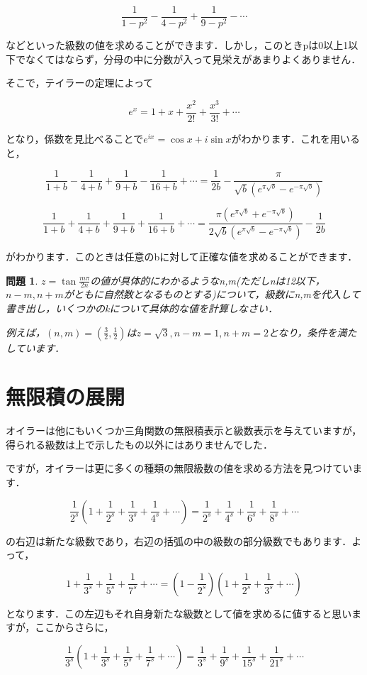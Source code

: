 \documentclass[./main]{subfiles}
\theoremstyle{break}
\newtheorem*{prb}{問題}
\begin{document}
\[\frac{1}{1-p^2}-\frac{1}{4-p^2}+\frac{1}{9-p^2}-\cdots\]

などといった級数の値を求めることができます．しかし，このときpは0以上1以下でなくてはならず，分母の中に分数が入って見栄えがあまりよくありません．

そこで，テイラーの定理によって

\[e^x=1+x+\frac{x^2}{2!}+\frac{x^3}{3!}+\cdots\]

となり，係数を見比べることで$e^{ix}=\cos x+i\sin x$がわかります．これを用いると，

\[\frac{1}{1+b}-\frac{1}{4+b}+\frac{1}{9+b}-\frac{1}{16+b}+\cdots=\frac{1}{2b}-\frac{\pi}{\sqrt{b}(e^{\pi\sqrt{b}}-e^{-\pi\sqrt{b}})}\]

\[\frac{1}{1+b}+\frac{1}{4+b}+\frac{1}{9+b}+\frac{1}{16+b}+\cdots=\frac{\pi(e^{\pi\sqrt{b}}+e^{-\pi\sqrt{b}})}{2\sqrt{b}(e^{\pi\sqrt{b}}-e^{-\pi\sqrt{b}})}-\frac{1}{2b}\]

がわかります．このときは任意のbに対して正確な値を求めることができます．

\begin{prb}
$z=\tan\frac{m\pi}{2n}$の値が具体的にわかるようなn,m(ただしnは12以下，$n-m,n+m$がともに自然数となるものとする)について，級数にn,mを代入して書き出し，いくつかのkについて具体的な値を計算しなさい．

例えば，$(n,m)=(\frac{3}{2},\frac{1}{2})$は$z=\sqrt{3},n-m=1,n+m=2$となり，条件を満たしています．
\end{prb}
\section{無限積の展開}
オイラーは他にもいくつか三角関数の無限積表示と級数表示を与えていますが，得られる級数は上で示したもの以外にはありませんでした．

ですが，オイラーは更に多くの種類の無限級数の値を求める方法を見つけています．

\[\frac{1}{2^s}\left( 1+\frac{1}{2^s}+\frac{1}{3^s}+\frac{1}{4^s}+\cdots \right)=\frac{1}{2^s}+\frac{1}{4^s}+\frac{1}{6^s}+\frac{1}{8^s}+\cdots\]

の右辺は新たな級数であり，右辺の括弧の中の級数の部分級数でもあります．よって，

\[1+\frac{1}{3^s}+\frac{1}{5^s}+\frac{1}{7^s}+\cdots=\left( 1-\frac{1}{2^s} \right)\left( 1+\frac{1}{2^s}+\frac{1}{3^s}+\cdots \right)\]

となります．この左辺もそれ自身新たな級数として値を求めるに値すると思いますが，ここからさらに，

\[\frac{1}{3^s}\left( 1+\frac{1}{3^s}+\frac{1}{5^s}+\frac{1}{7^s}+\cdots \right)=\frac{1}{3^s}+\frac{1}{9^s}+\frac{1}{15^s}+\frac{1}{21^s}+\cdots\]
\end{document}
